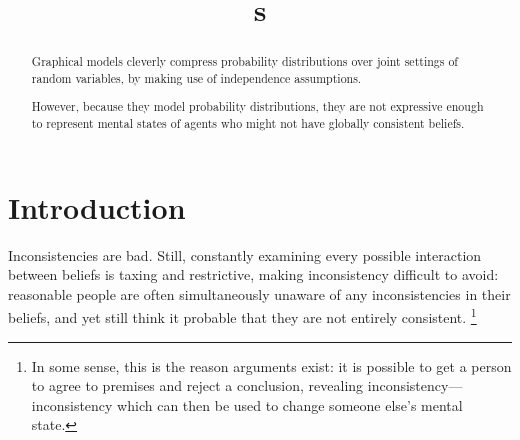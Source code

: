 \documentclass{article}
\title{\ModelName s}
\author{} %
\newcommand{\modelname}{probabilistic dependency graph}
\newcommand{\modelnames}{\modelname s}
\newcommand{\MN}{PDG}
\newcommand{\MNs}{\MN s}
\begin{document}
	\maketitle

	\begin{abstract}
		Graphical models cleverly compress probability distributions over joint settings of random variables, by making use of independence assumptions.
		
		However, because they model probability distributions, they are not expressive enough to represent mental states of agents who might not have globally consistent beliefs. 
			
		
	\end{abstract}


	\section{Introduction}

	Inconsistencies are bad. Still, constantly examining every possible interaction between beliefs is taxing and restrictive, making inconsistency difficult to avoid: reasonable people are often simultaneously unaware of any inconsistencies in their beliefs, and yet still think it probable that they are not entirely consistent.%
		\footnote{In some sense, this is the reason arguments exist: it is possible to get a person to agree to premises and reject a conclusion, revealing inconsistency---inconsistency which can then be used to change someone else's mental state. }
\end{document}

